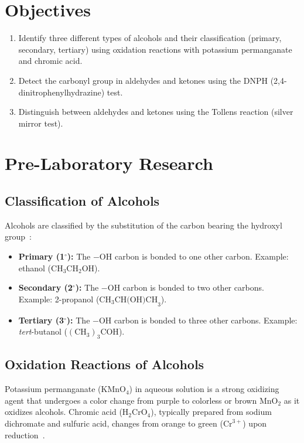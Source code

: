 \documentclass[12pt, a4paper]{article}
\begin{document}
\section{Objectives}

\begin{enumerate}[label=\arabic*.]
    \item Identify three different types of alcohols and their classification (primary, secondary, tertiary) using oxidation reactions with potassium permanganate and chromic acid.
    \item Detect the carbonyl group in aldehydes and ketones using the DNPH (2,4-dinitrophenylhydrazine) test.
    \item Distinguish between aldehydes and ketones using the Tollens reaction (silver mirror test).
\end{enumerate}

\section{Pre-Laboratory Research}

\subsection{Classification of Alcohols}
Alcohols are classified by the substitution of the carbon bearing the hydroxyl group~\cite{mcmurry2016}:
\begin{itemize}
    \item \textbf{Primary (1$^\circ$):} The $-\text{OH}$ carbon is bonded to one other carbon. Example: ethanol ($\text{CH}_3\text{CH}_2\text{OH}$).
    \item \textbf{Secondary (2$^\circ$):} The $-\text{OH}$ carbon is bonded to two other carbons. Example: 2-propanol ($\text{CH}_3\text{CH(OH)CH}_3$).
    \item \textbf{Tertiary (3$^\circ$):} The $-\text{OH}$ carbon is bonded to three other carbons. Example: \textit{tert}-butanol ($(\text{CH}_3)_3\text{COH}$).
\end{itemize}

\subsection{Oxidation Reactions of Alcohols}
Potassium permanganate ($\text{KMnO}_4$) in aqueous solution is a strong oxidizing agent that undergoes a color change from purple to colorless or brown $\text{MnO}_2$ as it oxidizes alcohols. Chromic acid ($\text{H}_2\text{CrO}_4$), typically prepared from sodium dichromate and sulfuric acid, changes from orange to green ($\text{Cr}^{3+}$) upon reduction~\cite{carey2017}.
\end{document}
